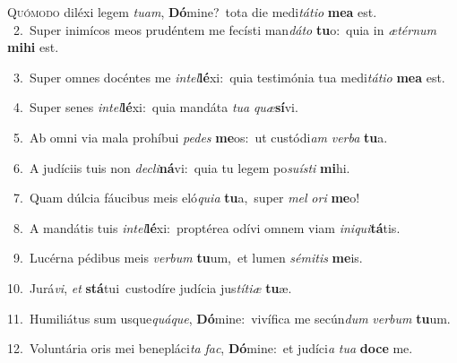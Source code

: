 \lettrine{\initial\textcolor{\initialcolor}{Q}}{uómodo} diléxi legem \textit{tu}\-\textit{am}, \textbf{Dó}\-mine?~\star tota die medi\-\textit{tá}\-\textit{ti}\textit{o} \textbf{me}\-\textbf{a} est.\\
{\numbfont\textcolor{\numbcolor}{~2.}}~Super inimícos meos prudéntem me fecísti man\-\textit{dá}\-\textit{to} \textbf{tu}\-o:~\star quia in \textit{æ}\-\textit{tér}\textit{num} \textbf{mi}\-\textbf{hi} est.\par
{\numbfont\textcolor{\numbcolor}{~3.}}~Super omnes docéntes me \textit{in}\-\textit{tel}\textbf{lé}xi:~\star quia testimónia tua medi\-\textit{tá}\-\textit{ti}\textit{o} \textbf{me}\-\textbf{a} est.\par
{\numbfont\textcolor{\numbcolor}{~4.}}~Super senes \textit{in}\-\textit{tel}\textbf{lé}xi:~\star quia mandáta \textit{tu}\-\textit{a} \textit{quæ}\-\textbf{sí}vi.\par
{\numbfont\textcolor{\numbcolor}{~5.}}~Ab omni via mala prohíbui \textit{pe}\-\textit{des} \textbf{me}\-os:~\star ut custódi\textit{am} \textit{ver}\-\textit{ba} \textbf{tu}\-a.\par
{\numbfont\textcolor{\numbcolor}{~6.}}~A judíciis tuis non \textit{de}\-\textit{cli}\textbf{ná}vi:~\star quia tu legem po\-\textit{su}\-\textit{ís}\textit{ti} \textbf{mi}\-hi.\par
{\numbfont\textcolor{\numbcolor}{~7.}}~Quam dúlcia fáucibus meis eló\-\textit{qui}\-\textit{a} \textbf{tu}\-a,~\star super \textit{mel} \textit{o}\-\textit{ri} \textbf{me}\-o!\par
{\numbfont\textcolor{\numbcolor}{~8.}}~A mandátis tuis \textit{in}\-\textit{tel}\textbf{lé}xi:~\star proptérea odívi omnem viam \textit{in}\-\textit{i}\textit{qui}\textbf{tá}tis.\par
{\numbfont\textcolor{\numbcolor}{~9.}}~Lucérna pédibus meis \textit{ver}\-\textit{bum} \textbf{tu}\-um,~\star et lumen \textit{sé}\-\textit{mi}\textit{tis} \textbf{me}\-is.\par
{\numbfont\textcolor{\numbcolor}{10.}}~Jurá\-\textit{vi}\-, \textit{et} \textbf{stá}\-tui~\star custodíre judícia jus\-\textit{tí}\-\textit{ti}\textit{æ} \textbf{tu}\-æ.\par
{\numbfont\textcolor{\numbcolor}{11.}}~Humiliátus sum usque\-\textit{quá}\-\textit{que}, \textbf{Dó}\-mine:~\star vivífica me secún\textit{dum} \textit{ver}\-\textit{bum} \textbf{tu}\-um.\par
{\numbfont\textcolor{\numbcolor}{12.}}~Voluntária oris mei benepláci\textit{ta} \textit{fac}\-, \textbf{Dó}\-mine:~\star et judíci\textit{a} \textit{tu}\-\textit{a} \textbf{do}\-\textbf{ce} me.\par
